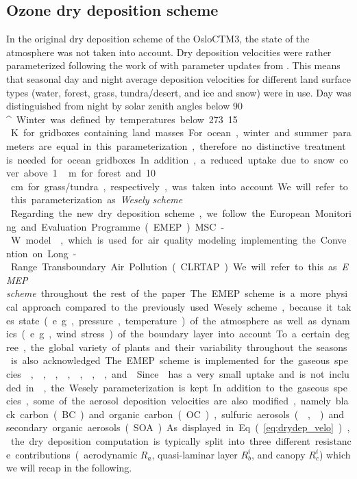 \documentclass[gmd, manuscript]{copernicus}
\begin{document}
\subsection{Ozone dry deposition scheme}
\label{subsec:DryDep}
In the original dry deposition scheme of the OsloCTM3, the state of the atmosphere was not taken into account. Dry deposition velocities were rather parameterized following the work of \citet{AE:Wesely1989} with parameter updates from \citet{JGR:Hough1991}. This means that seasonal day and night average deposition velocities for different land surface types (water, forest, grass, tundra/desert, and ice and snow) were in use. Day was distinguished from night by solar zenith angles below 90\,\unit{^\circ}. Winter was defined by temperatures below 273.15\,\unit{K} for gridboxes containing land masses. For ocean, winter and summer parameters are equal in this parameterization, therefore no distinctive treatment is needed for ocean gridboxes. In addition, a reduced uptake due to snow cover above 1\,\unit{m} for forest and 10\,\unit{cm} for grass/tundra, respectively, was taken into account. We will refer to this parameterization as \emph{Wesely scheme}.\\

Regarding the new dry deposition scheme, we follow the European Monitoring and Evaluation Programme (EMEP) MSC-W model \citep{WASP:Simpson2003,ACP:Simpson2012}, which is used for air quality modeling implementing the Convention on Long-Range Transboundary Air Pollution (CLRTAP). We will refer to this as \emph{EMEP scheme} throughout the rest of the paper. The EMEP scheme is a more physical approach compared to the previously used Wesely scheme, because it takes state (e.g., pressure, temperature)  of the atmosphere as well as dynamics (e.g., wind stress) of the boundary layer into account. To a certain degree, the global variety of plants and their variability throughout the seasons is also acknowledged. The EMEP scheme is implemented for the gaseous species , , , , , , , and . Since  has a very small uptake and is not included in \citet{WASP:Simpson2003,ACP:Simpson2012}, the Wesely parameterization is kept. In addition to the gaseous species, some of the aerosol deposition velocities are also modified, namely black carbon (BC) and organic carbon (OC), sulfuric aerosols (, ) and secondary organic aerosols (SOA). As displayed in Eq.~(\ref{eq:drydep_velo}), the dry deposition computation is typically split into three different resistance contributions (aerodynamic $R_a$, quasi-laminar layer $R^i_b$, and canopy $R^i_c$) which we will recap in the following.
\end{document}
